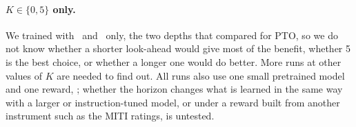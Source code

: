 \paragraph{\boldmath $K \in \{0, 5\}$ only.}
We trained with \Kz\ and \Kf\ only, the two depths that \citet{baruch2025pto} compared for PTO,
so we do not know whether a shorter look-ahead would give
most of the benefit, whether 5 is the best choice, or whether a longer one would do better. More
runs at other values of $K$ are needed to find out. All runs also use one small pretrained model and
one reward, \QQ; whether the horizon changes what is learned in the same way with a larger or
instruction-tuned model, or under a reward built from another instrument such as the MITI ratings,
is untested.





